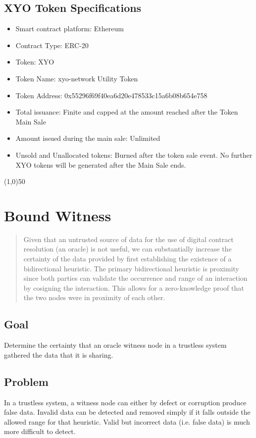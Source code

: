 \documentclass{article}
\begin{document}
\subsection {XYO Token Specifications}
\begin{itemize}
\item Smart contract platform: Ethereum
\item Contract Type: ERC-20
\item Token: XYO
\item Token Name: \Gls{xyo-network} Utility Token
\item Token Address: 0x55296f69f40ea6d20e478533c15a6b08b654e758
\item Total issuance: Finite and capped at the amount reached after the Token Main Sale
\item Amount issued during the main sale: Unlimited
\item Unsold and Unallocated tokens: Burned after the token sale event. No further XYO tokens will be generated after the Main Sale ends.
\end{itemize}

\begin{center}
\line(1,0){50}
\end{center}

\section {Bound Witness}
\begin{abstract}
Given that an untrusted source of data for the use of digital contract resolution (an \gls{oracle}) is not useful, we can substantially increase the \gls{certainty} of the data provided by first establishing the existence of a bidirectional \gls{heuristic}. The primary bidirectional heuristic is proximity since both parties can validate the occurrence and range of an interaction by cosigning the interaction. This allows for a zero-knowledge proof that the two nodes were in proximity of each other.
\end{abstract}

\subsection {Goal}
Determine the \gls{certainty} that an \gls{oracle} witness node in a trustless system gathered the data that it is sharing.

\subsection {Problem}
In a trustless system, a witness node can either by defect or corruption produce false data. Invalid data can be detected and removed simply if it falls outside the allowed range for that \gls{heuristic}. Valid but incorrect data (i.e. false data) is much more difficult to detect. 
\end{document}
